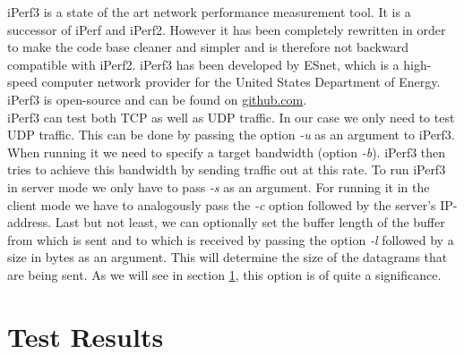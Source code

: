 iPerf3 is a state of the art network performance measurement tool. It is a successor of iPerf and iPerf2. However it has been completely rewritten in order to make the code base cleaner and simpler and is therefore not backward compatible with iPerf2. iPerf3 has been developed by \ac{ESnet}, which is a high-speed computer network provider for the United States Department of Energy. iPerf3 is open-source and can be found on \href{https://github.com/esnet/iperf}{github.com}\cite{mah2018iperf3}.
\\
iPerf3 can test both \ac{TCP} as well as \acs{UDP} traffic. In our case we only need to test \acs{UDP} traffic. This can be done by passing the option \textit{-u} as an argument to iPerf3. When running it we need to specify a target bandwidth (option \textit{-b}). iPerf3 then tries to achieve this bandwidth by sending traffic out at this rate. To run iPerf3 in server mode we only have to pass \textit{-s} as an argument. For running it in the client mode we have to analogously pass the \textit{-c} option followed by the server's \acs{IP}-address. Last but not least, we can optionally set the buffer length of the buffer from which is sent and to which is received by passing the option \textit{-l} followed by a size in bytes as an argument. This will determine the size of the datagrams that are being sent. As we will see in section \ref{Test Results}, this option is of quite a significance.

\section{Test Results}\label{Test Results}

